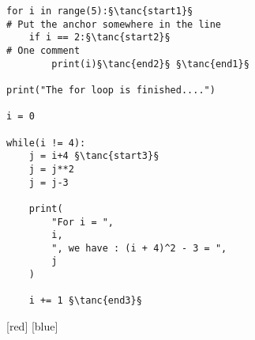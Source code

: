 \documentclass{article}
\newcommand{\tanc}[1]{%
		\begin{tikzpicture}[remember picture]
			\coordinate (#1) at (0,0);
		\end{tikzpicture}%
	}
\begin{document}
\lipsum[1]
\begin{lstlisting}
for i in range(5):§\tanc{start1}§
# Put the anchor somewhere in the line
    if i == 2:§\tanc{start2}§
# One comment
        print(i)§\tanc{end2}§ §\tanc{end1}§

print("The for loop is finished....")

i = 0

while(i != 4):
    j = i+4 §\tanc{start3}§
    j = j**2
    j = j-3
    
    print(
        "For i = ",
        i,
        ", we have : (i + 4)^2 - 3 = ",
        j
    )
    
    i += 1 §\tanc{end3}§
\end{lstlisting}
[red]
[blue]
\lipsum[2]
\end{document}
